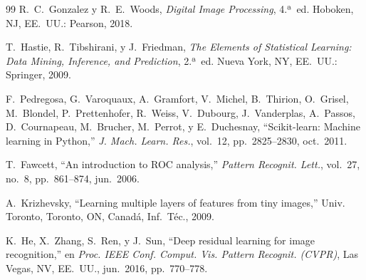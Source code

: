 \documentclass[conference,spanish]{IEEEtran}
\begin{document}
\begin{thebibliography}{99}
R.~C.~Gonzalez y R.~E.~Woods,
\emph{Digital Image Processing}, 4.ª~ed.
Hoboken, NJ, EE.~UU.: Pearson, 2018.

T.~Hastie, R.~Tibshirani, y J.~Friedman,
\emph{The Elements of Statistical Learning: Data Mining, Inference, and
  Prediction}, 2.ª~ed.
Nueva York, NY, EE.~UU.: Springer, 2009.

F.~Pedregosa, G.~Varoquaux, A.~Gramfort, V.~Michel, B.~Thirion,
O.~Grisel, M.~Blondel, P.~Prettenhofer, R.~Weiss, V.~Dubourg,
J.~Vanderplas, A.~Passos, D.~Cournapeau, M.~Brucher, M.~Perrot,
y E.~Duchesnay,
``Scikit-learn: Machine learning in {Python},''
\emph{J. Mach. Learn. Res.}, vol.~12, pp.~2825--2830, oct.~2011.

T.~Fawcett,
``An introduction to ROC analysis,''
\emph{Pattern Recognit. Lett.}, vol.~27, no.~8, pp.~861--874, jun.~2006.

A.~Krizhevsky,
``Learning multiple layers of features from tiny images,''
Univ. Toronto, Toronto, ON, Canadá, Inf.~Téc., 2009.

K.~He, X.~Zhang, S.~Ren, y J.~Sun,
``Deep residual learning for image recognition,''
en \emph{Proc. IEEE Conf. Comput. Vis. Pattern Recognit. (CVPR)},
Las Vegas, NV, EE.~UU., jun.~2016, pp.~770--778.

\end{thebibliography}
\end{document}
